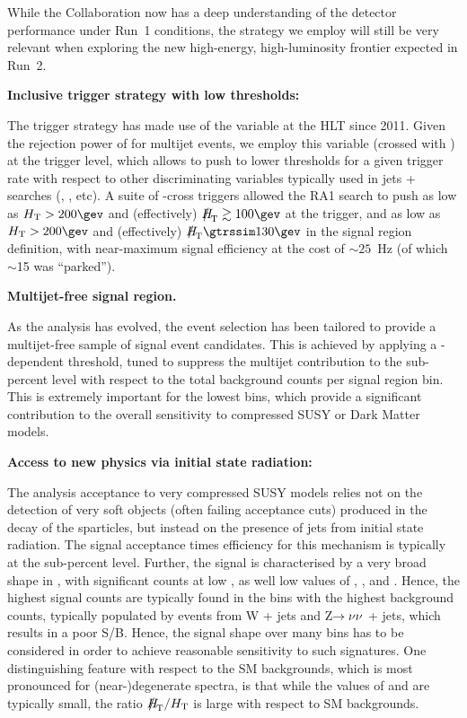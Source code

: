 
While the Collaboration now has a deep understanding of the detector
performance under Run~1 conditions, the strategy we employ will still
be very relevant when exploring the new high-energy, high-luminosity
frontier expected in Run~2.

{\bf Inclusive trigger strategy with low thresholds:}

The trigger strategy has made use of the \alphat variable at the HLT
since 2011. Given the rejection power of \alphat for multijet events,
we employ this variable (crossed with \scalht) at the trigger level,
which allows to push to lower thresholds for a given trigger rate with
respect to other discriminating variables typically used in jets +
\met searches (\eg \met, \mht, etc). A suite of \scalht-\alphat cross
triggers allowed the RA1 search to push as low as $\scalht > 200\gev$
and (effectively) $\mht \gtrsim 100\gev$ at the trigger, and as low as
$\scalht > 200\gev$ and (effectively) $\mht \gtrssim 130\gev$ in the
signal region definition, with near-maximum signal efficiency at the
cost of $\sim25$~Hz (of which $\sim$15 was ``parked'').

{\bf Multijet-free signal region.}

As the analysis has evolved, the event selection has been tailored to
provide a multijet-free sample of signal event candidates. This is
achieved by applying a \scalht-dependent \alphat threshold, tuned to
suppress the multijet contribution to the sub-percent level with
respect to the total background counts per signal region bin. This is
extremely important for the lowest \scalht bins, which provide a
significant contribution to the overall sensitivity to compressed SUSY
or Dark Matter models.

{\bf Access to new physics via initial state radiation:}

The analysis acceptance to very compressed SUSY models relies not on
the detection of very soft objects (often failing acceptance cuts)
produced in the decay of the sparticles, but instead on the presence
of jets from initial state radiation. The signal acceptance times
efficiency for this mechanism is typically at the sub-percent level.
Further, the signal is characterised by a very broad shape in \scalht,
with significant counts at low \scalht, as well low values of \njet,
\nb, and \mht. Hence, the highest signal counts are typically found in
the bins with the highest background counts, typically populated by
events from W + jets and Z$\rightarrow\nu\nu$ + jets, which results in a poor
S/B. Hence, the signal shape over many bins has to be considered in
order to achieve reasonable sensitivity to such signatures. One
distinguishing feature with respect to the SM backgrounds, which is
most pronounced for (near-)degenerate spectra, is that while the
values of \scalht and \mht are typically small, the ratio $\mht /
\scalht$ is large with respect to SM backgrounds.

